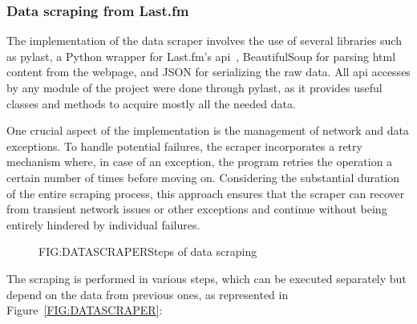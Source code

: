 \subsubsection{Data scraping from Last.fm\label{SSS:DATASET_DS}}

The implementation of the data scraper involves the use of several libraries such as pylast, a Python wrapper for Last.fm's \acs{api}~\cite{PYLAST}, BeautifulSoup for parsing \acs{html} content from the webpage, and JSON for serializing the raw data. All \acs{api} accesses by any module of the project were done through pylast, as it provides useful classes and methods to acquire mostly all the needed data.

One crucial aspect of the implementation is the management of network and data exceptions. To handle potential failures, the scraper incorporates a retry mechanism where, in case of an exception, the program retries the operation a certain number of times before moving on. Considering the substantial duration of the entire scraping process, this approach ensures that the scraper can recover from transient network issues or other exceptions and continue without being entirely hindered by individual failures.

\begin{figure}[Steps of data scraping]{FIG:DATASCRAPER}{Steps of data scraping}
\end{figure}

The scraping is performed in various steps, which can be executed separately but depend on the data from previous ones, as represented in Figure~\ref{FIG:DATASCRAPER}:

